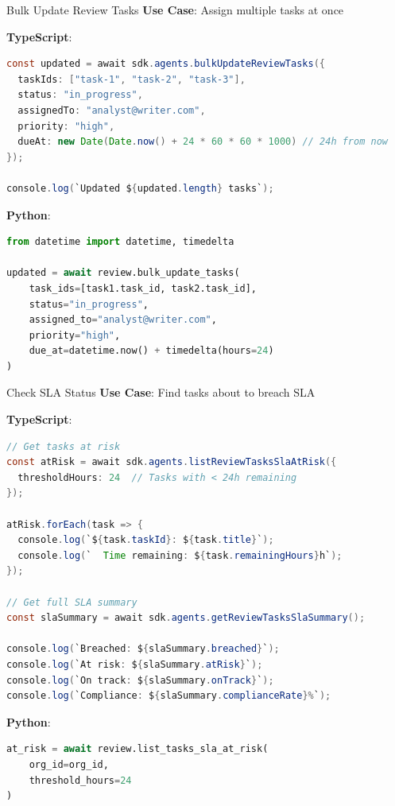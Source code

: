 \documentclass[aspectratio=169]{beamer}
\begin{document}
\begin{frame}[fragile]{Bulk Update Review Tasks}
\textbf{Use Case}: Assign multiple tasks at once

\textbf{TypeScript}:
\begin{lstlisting}[language=Java]
const updated = await sdk.agents.bulkUpdateReviewTasks({
  taskIds: ["task-1", "task-2", "task-3"],
  status: "in_progress",
  assignedTo: "analyst@writer.com",
  priority: "high",
  dueAt: new Date(Date.now() + 24 * 60 * 60 * 1000) // 24h from now
});

console.log(`Updated ${updated.length} tasks`);
\end{lstlisting}

\textbf{Python}:
\begin{lstlisting}[language=Python]
from datetime import datetime, timedelta

updated = await review.bulk_update_tasks(
    task_ids=[task1.task_id, task2.task_id],
    status="in_progress",
    assigned_to="analyst@writer.com",
    priority="high",
    due_at=datetime.now() + timedelta(hours=24)
)
\end{lstlisting}
\end{frame}

\begin{frame}[fragile]{Check SLA Status}
\textbf{Use Case}: Find tasks about to breach SLA

\textbf{TypeScript}:
\begin{lstlisting}[language=Java]
// Get tasks at risk
const atRisk = await sdk.agents.listReviewTasksSlaAtRisk({
  thresholdHours: 24  // Tasks with < 24h remaining
});

atRisk.forEach(task => {
  console.log(`${task.taskId}: ${task.title}`);
  console.log(`  Time remaining: ${task.remainingHours}h`);
});

// Get full SLA summary
const slaSummary = await sdk.agents.getReviewTasksSlaSummary();

console.log(`Breached: ${slaSummary.breached}`);
console.log(`At risk: ${slaSummary.atRisk}`);
console.log(`On track: ${slaSummary.onTrack}`);
console.log(`Compliance: ${slaSummary.complianceRate}%`);
\end{lstlisting}

\textbf{Python}:
\begin{lstlisting}[language=Python]
at_risk = await review.list_tasks_sla_at_risk(
    org_id=org_id,
    threshold_hours=24
)
\end{lstlisting}
\end{frame}
\end{document}
